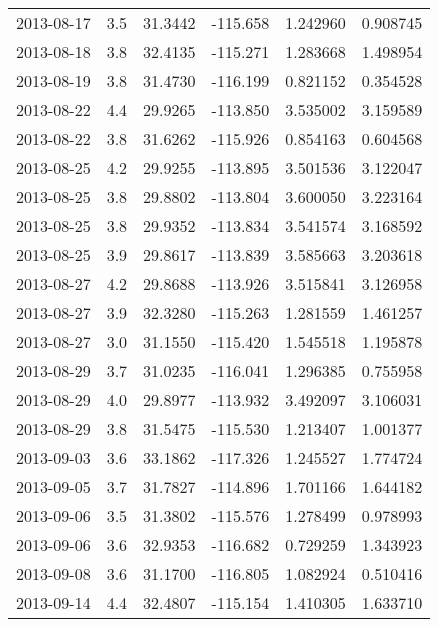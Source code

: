 \begin{tabular}{lrrrrr}
2013-08-17 &       3.5 &  31.3442 &  -115.658 &         1.242960 &         0.908745 \\
2013-08-18 &       3.8 &  32.4135 &  -115.271 &         1.283668 &         1.498954 \\
2013-08-19 &       3.8 &  31.4730 &  -116.199 &         0.821152 &         0.354528 \\
2013-08-22 &       4.4 &  29.9265 &  -113.850 &         3.535002 &         3.159589 \\
2013-08-22 &       3.8 &  31.6262 &  -115.926 &         0.854163 &         0.604568 \\
2013-08-25 &       4.2 &  29.9255 &  -113.895 &         3.501536 &         3.122047 \\
2013-08-25 &       3.8 &  29.8802 &  -113.804 &         3.600050 &         3.223164 \\
2013-08-25 &       3.8 &  29.9352 &  -113.834 &         3.541574 &         3.168592 \\
2013-08-25 &       3.9 &  29.8617 &  -113.839 &         3.585663 &         3.203618 \\
2013-08-27 &       4.2 &  29.8688 &  -113.926 &         3.515841 &         3.126958 \\
2013-08-27 &       3.9 &  32.3280 &  -115.263 &         1.281559 &         1.461257 \\
2013-08-27 &       3.0 &  31.1550 &  -115.420 &         1.545518 &         1.195878 \\
2013-08-29 &       3.7 &  31.0235 &  -116.041 &         1.296385 &         0.755958 \\
2013-08-29 &       4.0 &  29.8977 &  -113.932 &         3.492097 &         3.106031 \\
2013-08-29 &       3.8 &  31.5475 &  -115.530 &         1.213407 &         1.001377 \\
2013-09-03 &       3.6 &  33.1862 &  -117.326 &         1.245527 &         1.774724 \\
2013-09-05 &       3.7 &  31.7827 &  -114.896 &         1.701166 &         1.644182 \\
2013-09-06 &       3.5 &  31.3802 &  -115.576 &         1.278499 &         0.978993 \\
2013-09-06 &       3.6 &  32.9353 &  -116.682 &         0.729259 &         1.343923 \\
2013-09-08 &       3.6 &  31.1700 &  -116.805 &         1.082924 &         0.510416 \\
2013-09-14 &       4.4 &  32.4807 &  -115.154 &         1.410305 &         1.633710 \\

\end{tabular}
